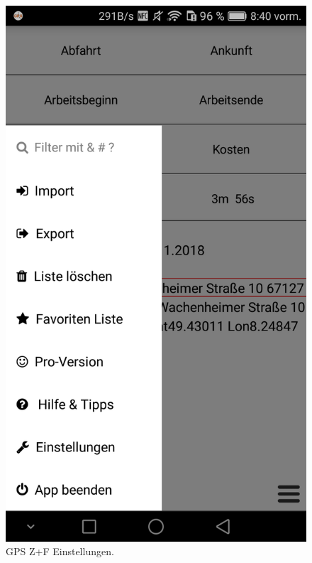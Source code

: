 \begin{figure}[H]%
    \begin{minipage}[b]{.4\linewidth} %
        \includegraphics[scale=0.14]{img/gps3}
        \caption{\label{img:img/gps3}GPS Z+F Einstellungen.}
    \end{minipage}
    \hspace{0.1\linewidth}%
    \begin{minipage}[b]{.4\linewidth} %

\end{minipage}
\end{figure}
